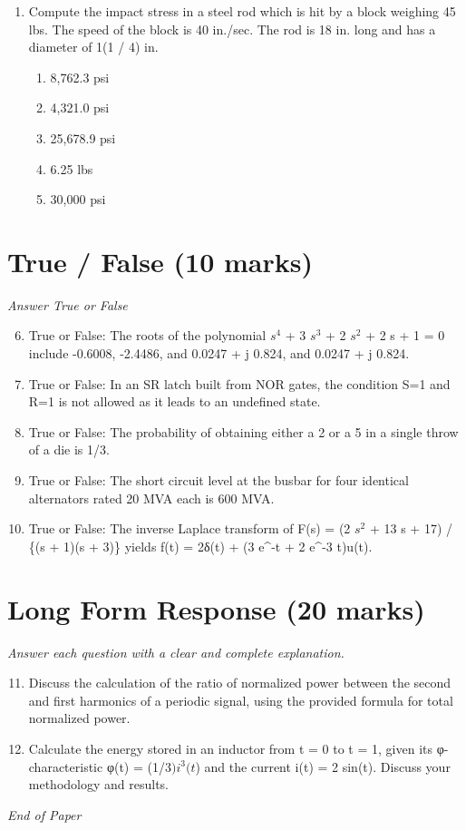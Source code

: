 \documentclass[12pt]{article}
\begin{document}
\begin{enumerate}[label=\arabic*.]
\begin{enumerate}[label=(\alph*)]
    \item 0.6 msec
    \item 0.25 msec
    \item 0.1 msec
\end{enumerate}
\item Compute the impact stress in a steel rod which is hit by a block weighing 45 lbs. The speed of the block is 40 in./sec. The rod is 18 in. long and has a diameter of 1(1 / 4) in.
\begin{enumerate}[label=(\alph*)]
    \item 8,762.3 psi
    \item 4,321.0 psi
    \item 25,678.9 psi
    \item 6.25 lbs
    \item 30,000 psi
\end{enumerate}
\end{enumerate}

\section*{True / False (10 marks)}
\textit{Answer True or False}
\begin{enumerate}[label=\arabic*.]
\setcounter{enumi}{5}
\item True or False: The roots of the polynomial $s^4$ + 3 $s^3$ + 2 $s^2$ + 2 s + 1 = 0 include -0.6008, -2.4486, and 0.0247 + j 0.824, and 0.0247 + j 0.824.
\item True or False: In an SR latch built from NOR gates, the condition S=1 and R=1 is not allowed as it leads to an undefined state.
\item True or False: The probability of obtaining either a 2 or a 5 in a single throw of a die is 1/3.
\item True or False: The short circuit level at the busbar for four identical alternators rated 20 MVA each is 600 MVA.
\item True or False: The inverse Laplace transform of F(s) = (2 $s^2$ + 13 s + 17) / \{(s + 1)(s + 3)\} yields f(t) = 2δ(t) + (3 e^-t + 2 e^-3 t)u(t).
\end{enumerate}

\section*{Long Form Response (20 marks)}
\textit{Answer each question with a clear and complete explanation.}
\begin{enumerate}[label=\arabic*.]
\setcounter{enumi}{10}
\item Discuss the calculation of the ratio of normalized power between the second and first harmonics of a periodic signal, using the provided formula for total normalized power.
\item Calculate the energy stored in an inductor from t = 0 to t = 1, given its φ-characteristic φ(t) = (1/$3)i^3(t$) and the current i(t) = 2 sin(t). Discuss your methodology and results.
\end{enumerate}

\vfill
\noindent\textit{End of Paper}
\end{document}
